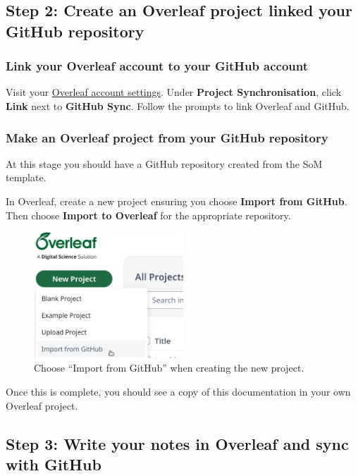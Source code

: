 \subsection{Step 2: Create an Overleaf project linked your GitHub repository}

\subsubsection{Link your Overleaf account to your GitHub account}

Visit your \href{https://www.overleaf.com/user/settings}{Overleaf account settings}. Under \textbf{Project Synchronisation}, click \textbf{Link} next to \textbf{GitHub Sync}. Follow the prompts to link Overleaf and GitHub.

\subsubsection{Make an Overleaf project from your GitHub repository}

At this stage you should have a GitHub repository created from the SoM template.

In Overleaf, create a new project ensuring you choose \textbf{Import from GitHub}. Then choose \textbf{Import to Overleaf} for the appropriate repository.

\begin{figure}[h]
    \centering
    \includegraphics[width=0.5\textwidth]{img/overleaf_new.png}
    \caption{Choose ``Import from GitHub'' when creating the new project.}
    \label{fig:gh-overleaf-new}
\end{figure}

Once this is complete, you should see a copy of this documentation in your own Overleaf project.


\subsection{Step 3: Write your notes in Overleaf and sync with GitHub}

